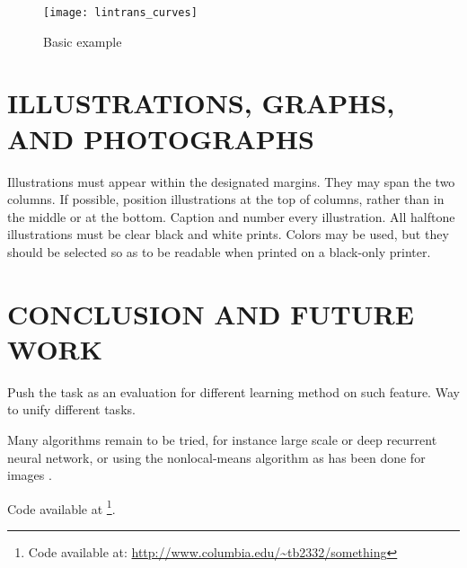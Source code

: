 \documentclass{article}
\begin{document}
\begin{figure}[t]
\begin{center}
\texttt{[image: lintrans\_curves]}
\end{center}
\caption{Basic example}
\label{fig:lintrans}
\end{figure}


\section{ILLUSTRATIONS, GRAPHS, AND PHOTOGRAPHS}
\label{sec:illust}

Illustrations must appear within the designated margins.  They may span the two
columns.  If possible, position illustrations at the top of columns, rather
than in the middle or at the bottom.  Caption and number every illustration.
All halftone illustrations must be clear black and white prints.  Colors may be
used, but they should be selected so as to be readable when printed on a
black-only printer.


\section{CONCLUSION AND FUTURE WORK}
\label{sec:conclusion}
Push the task as an evaluation for different learning method on such feature.
Way to unify different tasks.

Many algorithms remain to be tried, for instance large scale or deep recurrent
neural network, or using the nonlocal-means algorithm as has been done for
images \cite{Buades2005}.

Code available at \footnote{Code available at: \url{http://www.columbia.edu/~tb2332/something}}.





\end{document}
